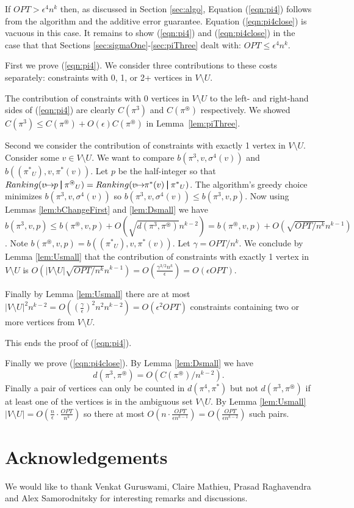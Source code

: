 \documentclass[dvips,11pt,letter]{article}
\newcommand{\sm}{\setminus} \newcommand{\compl}[1]{\overline{#1}}                \newcommand{\floor}[1]{\left\lfloor #1 \right\rfloor}
\newcommand{\unaryOrdering}{\!\!\mapsto\!\!}
\newcommand{\bp}{\,\,\rule[-0.22em]{0.08em}{1em}\,\,} \newcommand{\restrictO}[2]{{#1}_{#2}}
\begin{document}
If $OPT > \epsilon^4 n^k$ then, as discussed in Section \ref{sec:algo}, Equation (\ref{eqn:pi4}) follows from the algorithm and the additive error guarantee. Equation (\ref{eqn:pi4close}) is vacuous in this case. It remains to show (\ref{eqn:pi4}) and (\ref{eqn:pi4close}) in the case that that Sections \ref{sec:sigmaOne}-\ref{sec:piThree} dealt with: $OPT \le \epsilon^4 n^k$.

First we prove (\ref{eqn:pi4}). We consider three contributions to these costs separately: constraints with 0, 1, or 2+ vertices in $V \sm U$. 

The contribution of constraints with 0 vertices in $V \sm U$ to the left- and right-hand sides of (\ref{eqn:pi4}) are clearly $C(\pi^3)$ and $C(\pi^\circledast)$ respectively. We showed $C(\pi^3) \le C(\pi^\circledast) + O(\epsilon) C(\pi^\circledast)$ in Lemma~\ref{lem:piThree}.

Second we consider the contribution of constraints with exactly 1 vertex in $V \sm U$. Consider some $v \in V \sm U$.  We want to compare $b(\pi^3, v, \sigma^4(v))$ and $b((\restrictO{\pi^*}{U}), v, \pi^*(v))$. Let $p$ be the half-integer so that $Ranking(v \unaryOrdering p \bp \restrictO{\pi^\circledast}{U}) = Ranking(v \unaryOrdering \pi^*(v) \bp \restrictO{\pi^*}{U})$. The algorithm's greedy choice minimizes $b(\pi^3, v, \sigma^4(v))$ so $b(\pi^3, v, \sigma^4(v)) \le b(\pi^3, v, p)$. Now using Lemmas \ref{lem:bChangeFirst} and \ref{lem:Dsmall} we have $b(\pi^3, v, p) \le b(\pi^\circledast, v, p) + O(\sqrt{d(\pi^3, \pi^\circledast)} n^{k-2}) = b(\pi^\circledast, v, p) + O(\sqrt{OPT/n^{k}}n^{k-1})$.  Note $b(\pi^\circledast, v, p) = b((\restrictO{\pi^*}{U}), v, \pi^*(v))$. Let $\gamma = OPT / n^k$.
We conclude by Lemma \ref{lem:Usmall} that the contribution of constraints with exactly 1 vertex in $V \sm U$ is $O(|V \sm U| \sqrt{OPT / n^{k}} n^{k-1}) = O(\frac{\gamma^{3/2} n^k}{\epsilon}) = O(\epsilon OPT)$.

Finally by Lemma \ref{lem:Usmall} there are at most $|V \sm U|^2 n^{k-2} = O((\frac{\gamma}{\epsilon})^2 n^2 n^{k-2}) =O(\epsilon^2 OPT)$ constraints containing two or more vertices from $V \sm U$.

This ends the proof of (\ref{eqn:pi4}).

Finally we prove (\ref{eqn:pi4close}). By Lemma \ref{lem:Dsmall} we have
\[
d(\pi^3,\pi^\circledast)= O(C(\pi^\circledast) / n^{k-2})
.\]
Finally a pair of vertices can only be counted in $d(\pi^4,\pi^*)$ but not $d(\pi^3,\pi^\circledast)$ if at least one of the vertices is in the ambiguous set $V \sm U$. By Lemma \ref{lem:Usmall}
$|V \sm U| = O( \frac{n}{\epsilon} \cdot \frac{OPT}{n^k})$ so there at most $O(n \cdot \frac{OPT}{\epsilon n^{k-1}}) = O(\frac{OPT}{\epsilon n^{k-2}})$ such pairs.

\section*{Acknowledgements}
We would like to thank Venkat Guruswami, Claire Mathieu, Prasad Raghavendra and Alex Samorodnitsky for interesting remarks and discussions.

\nocite{gutin09,KS09,CS98,KS09,AA07,ALS09,RV07,MS08,FK99,FKK06,BFK03,AKK95,AFKK02,CGM09}   


  
\end{document}
